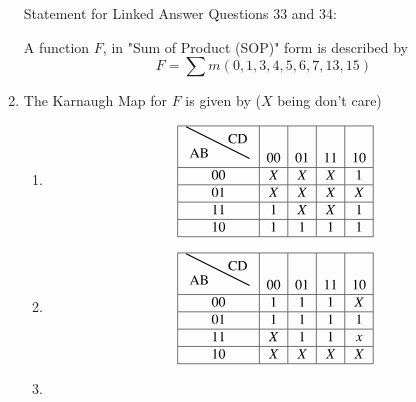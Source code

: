 \documentclass[journal]{IEEEtran}
\begin{document}
\begin{enumerate}
Statement for Linked Answer Questions 33 and 34:

A function $F$, in "Sum of Product (SOP)" form is described by $$F=\sum m(0,1,3,4,5,6,7,13,15)$$

    \item The Karnaugh Map for $F$ is given by ($X$ being don't care)
        \begin{enumerate}
            \item $$
                \begin{array}{|c|c|c|c|c|}
                \hline
                    \begin{tikzpicture}
        \node at (0.1,0.1) {CD};
        \draw[thick] (0.4,-0.4) -- (-1.2,0.4);
        \node[anchor=south east] at (-0.5,-0.5) {AB};
    \end{tikzpicture}
                & 00 & 01 & 11 & 10 \\
                \hline
                00 & X & X & X & 1 \\
                \hline
                01 & X & X & X & X \\
                \hline
                11 & 1 & X & X & 1 \\
                \hline
                10 & 1 & 1 & 1 & 1 \\
                \hline
            \end{array}
            $$
            \item $$
                \begin{array}{|c|c|c|c|c|}
                \hline
                    \begin{tikzpicture}
        \node at (0.1,0.1) {CD};
        \draw[thick] (0.4,-0.4) -- (-1.2,0.4);
        \node[anchor=south east] at (-0.5,-0.5) {AB};
    \end{tikzpicture}
                & 00 & 01 & 11 & 10 \\
                \hline
                00 & 1 & 1 & 1 & X \\
                \hline
                01 & 1 & 1 & 1 & 1 \\
                \hline
                11 & X & 1 & 1 & x \\
                \hline
                10 & X & X & X & X \\
                \hline
            \end{array}
            $$
            \item $$
                \begin{array}{|c|c|c|c|c|}

\end{array}$$
\end{enumerate}
\end{enumerate}
\end{document}
